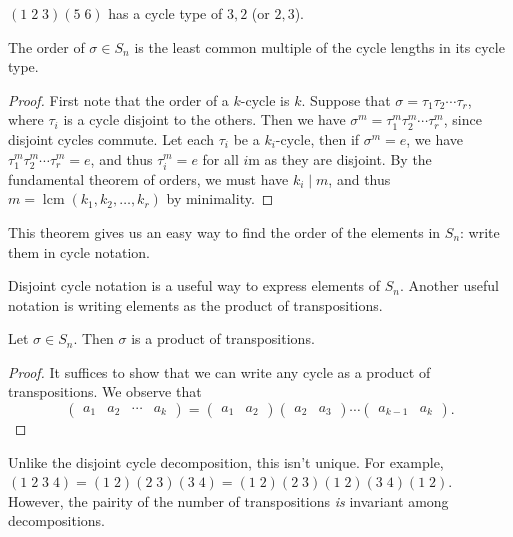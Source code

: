 \documentclass[a4]{scrreprt}
\begin{document}
\begin{example}
	$(1\; 2\; 3)(5\; 6)$ has a cycle type of $3, 2$ (or $2, 3$).
\end{example}

\begin{theorem}
	The order of $\sigma \in S_n$ is the least common multiple of the cycle lengths in its cycle type.
\end{theorem}
\begin{proof}
	First note that the order of a $k$-cycle is $k$. Suppose that $\sigma = \tau_1 \tau_2 \cdots \tau_r$, where $\tau_i$ is a cycle disjoint to the others. Then we have $\sigma^m = \tau_1^m \tau_2^m \cdots \tau_r^m$, since disjoint cycles commute. Let each $\tau_i$ be a $k_i$-cycle, then if $\sigma^m = e$, we have $\tau_1^m \tau_2^m \cdots \tau_r^m = e$, and thus $\tau_i^m = e$ for all $i$m as they are disjoint. By the fundamental theorem of orders, we must have $k_i \mid m$, and thus $m = \operatorname{lcm}(k_1, k_2, \dots, k_r)$ by minimality.
\end{proof}

This theorem gives us an easy way to find the order of the elements in $S_n$: write them in cycle notation.

Disjoint cycle notation is a useful way to express elements of $S_n$. Another useful notation is writing elements as the product of transpositions.

\begin{theorem}
	Let $\sigma \in S_n$. Then $\sigma$ is a product of transpositions.
\end{theorem}
\begin{proof}
	It suffices to show that we can write any cycle as a product of transpositions. We observe that
	$$
	\begin{pmatrix} a_1 & a_2 & \cdots & a_k \end{pmatrix} = \begin{pmatrix} a_1 & a_2 \end{pmatrix}  \begin{pmatrix} a_2 & a_3 \end{pmatrix} \cdots  \begin{pmatrix} a_{k - 1} & a_k \end{pmatrix}.
	$$
\end{proof}

Unlike the disjoint cycle decomposition, this isn't unique. For example, $(1\; 2\; 3\; 4) = (1\; 2)(2\; 3)(3\; 4) = (1\; 2) (2\; 3)(1\; 2)(3\; 4)(1\; 2)$. However, the pairity of the number of transpositions \emph{is} invariant among decompositions.
\end{document}
